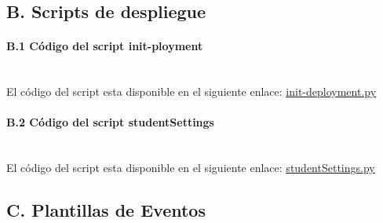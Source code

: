 \documentclass[
]{article}
\begin{document}
\hypertarget{header-n220}{%
\subsection{B. Scripts de despliegue}\label{header-n220}}

\hypertarget{header-n221}{%
\paragraph{B.1 Código del script init-ployment}\label{header-n221}}
\leavevmode
\newline
\\
El código del script esta disponible en el siguiente enlace:  \underline{\href{https://github.com/manujose94/FINAL-PROJECT-ICP/blob/main/init-deployment.py}{init-deployment.py}}\\

\hypertarget{header-n223}{%
\paragraph{B.2 Código del script studentSettings}\label{header-n223}}
\leavevmode
\newline
\\
El código del script esta disponible en el siguiente enlace:  \underline{\href{https://github.com/manujose94/FINAL-PROJECT-ICP/blob/main/studentSettings.py}{studentSettings.py}}\\

\hypertarget{header-n225}{%
\subsection{C. Plantillas de Eventos}\label{header-n225}}
\end{document}
